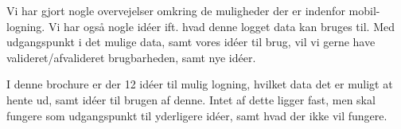 Vi har gjort nogle overvejelser omkring de muligheder der er indenfor mobil-logning.
Vi har også nogle idéer ift. hvad denne logget data kan bruges til.
Med udgangspunkt i det mulige data, samt vores idéer til brug, vil vi gerne have valideret/afvalideret brugbarheden, samt nye idéer.

I denne brochure er der 12 idéer til mulig logning, hvilket data det er muligt at hente ud, samt idéer til brugen af denne.
Intet af dette ligger fast, men skal fungere som udgangspunkt til yderligere idéer, samt hvad der ikke vil fungere.